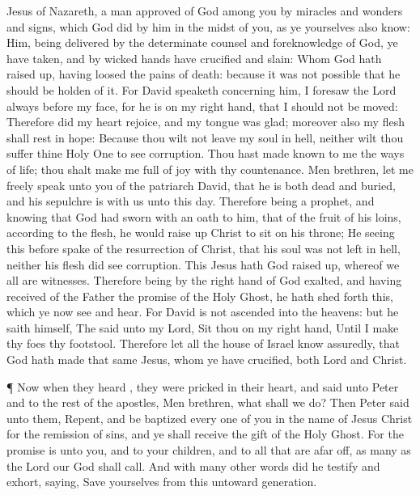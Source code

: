 {Jesus of
Nazareth, a
man
approved
of
God
among
you
by
miracles
and
wonders
and
signs,
which
God
did
by
him
in the
midst of
you,
as ye
yourselves
also
know:
Him, being
delivered by
the
determinate
counsel
and
foreknowledge of
God, ye have
taken, and
by
wicked
hands have
crucified and
slain:
Whom
God hath raised
up, having
loosed the
pains of
death:
because it
was
not
possible
that
he should be
holden
of
it.
For
David
speaketh
concerning
him, I
foresaw the
Lord
always
before my
face,
for he
is
on
my right
hand,
that I
should
not be
moved:
Therefore
did
my
heart
rejoice,
and
my
tongue was
glad;
moreover
also
my
flesh shall
rest
in
hope:
Because thou
wilt
not
leave
my
soul
in
hell,
neither wilt thou
suffer
thine Holy
One to
see
corruption.
Thou hast made
known to
me the
ways of
life; thou shalt
make
me
full of
joy
with
thy
countenance.
Men
{}
brethren,
let
me
freely
speak
unto
you
of the
patriarch
David,
that he
is
both
dead
and
buried,
and
his
sepulchre
is
with
us
unto
this
day.
Therefore
being a
prophet,
and
knowing
that
God had
sworn with an
oath to
him,
that
of the
fruit of
his
loins, according
to the
flesh, he would raise
up
Christ to
sit
on
his
throne;
He seeing
this before
spake
of the
resurrection of
Christ,
that
his
soul
was
not
left
in
hell,
neither
his
flesh did
see
corruption.
This
Jesus
hath
God raised
up,
whereof
we
all
are
witnesses.
Therefore
being by the right
hand of
God
exalted,
and having
received
of the
Father the
promise of
the
Holy
Ghost, he hath shed
forth
this,
which
ye
now
see
and
hear.
For
David
is
not
ascended
into the
heavens:
but he
saith
himself, The
{}
said
unto
my
Lord, Sit
thou
on
my right
hand,
Until I
make
thy
foes
thy
footstool.
Therefore
let
all the
house of
Israel
know
assuredly,
that
God hath
made
that
same
Jesus,
whom
ye have
crucified,
both
Lord
and
Christ.
\par }{\PP {}¶ Now
when they
heard
{}, they were
pricked in their
heart,
and
said
unto
Peter
and to the
rest of the
apostles,
Men
{}
brethren,
what shall we
do?
Then
Peter
said
unto
them,
Repent,
and be
baptized every
one of
you
in the
name of
Jesus
Christ
for the
remission of
sins,
and ye shall
receive the
gift of
the
Holy
Ghost.
For the
promise
is unto
you,
and
to
your
children,
and to
all
that
are afar
off,
{} as many
as the
Lord
our
God shall
call.
And
with
many
other
words did he
testify
and
exhort,
saying, Save
yourselves
from
this
untoward
generation.
}
